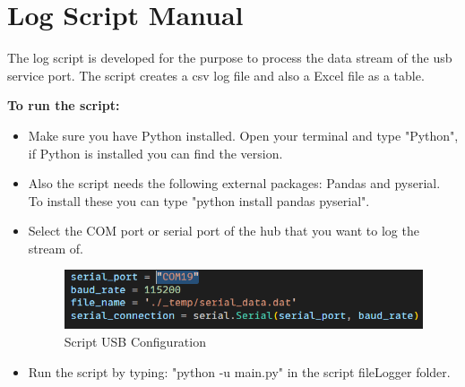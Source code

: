 \chapter{Log Script Manual}
The log script is developed for the purpose to process the data stream of the usb service port. The script creates a csv log file and also a Excel file as a table.

\textbf{To run the script:}
\begin{itemize}
  \item Make sure you have Python installed. 
  Open your terminal and type "Python", if Python is installed you can find the version. 
  \item Also the script needs the following external packages: Pandas and pyserial. \\
  To install these you can type "python install pandas pyserial".
  \item Select the COM port or serial port of the hub that you want to log the stream of. \\
 \begin{figure}[h!]
  \includegraphics{figures/Script COM selection.png}
  \caption{Script USB Configuration}
  \end{figure}
 \item Run the script by typing: "python -u main.py" in the script fileLogger folder. 
\end{itemize}
